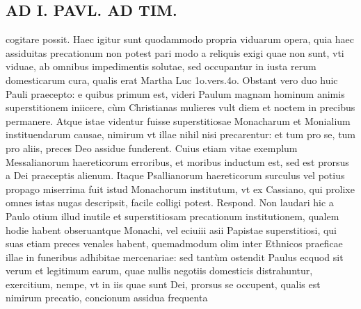 \documentclass{article}
\begin{document}
\begin{pages}
\section*{AD I. PAVL. AD TIM. }
\marginpar{[ p.260 ]}\pstart cogitare possit. Haec igitur sunt quodammodo propria viduarum opera, quia haec assiduitas precationum non potest pari modo a reliquis exigi quae non sunt, vti viduae, ab omnibus impedimentis solutae, sed occupantur in iusta rerum domesticarum cura, qualis erat Martha Luc 1o.vers.4o.  \pend\pstart Obstant vero duo huic Pauli praecepto: e quibus primum est, videri Paulum magnam hominum animis superstitionem iniicere, cùm Christianas mulieres vult diem et noctem in precibus permanere. Atque istae videntur fuisse superstitiosae Monacharum et Monialium instituendarum causae, nimirum vt illae nihil nisi precarentur: et tum pro se, tum pro aliis, preces Deo assidue funderent.  \pend\pstart Cuius etiam vitae exemplum Messalianorum haereticorum erroribus, et moribus inductum est, sed est prorsus a Dei praeceptis alienum. Itaque  Psallianorum haereticorum surculus vel potius propago miserrima fuit istud Monachorum institutum, vt ex Cassiano, qui prolixe omnes istas nugas descripsit, facile colligi potest. Respond. Non laudari hic a Paulo otium illud inutile et superstitiosam precationum institutionem, qualem hodie habent obseruantque Monachi, vel eciuiii asii Papistae superstitiosi, qui suas etiam preces venales habent, quemadmodum olim inter Ethnicos praeficae illae in funeribus adhibitae mercenariae: sed tantùm ostendit Paulus ecquod sit verum et legitimum earum, quae nullis negotiis domesticis distrahuntur, exercitium, nempe, vt in iis quae sunt Dei, prorsus se occupent, qualis est nimirum precatio, concionum assidua frequenta\pend

\end{pages}
\end{document}

